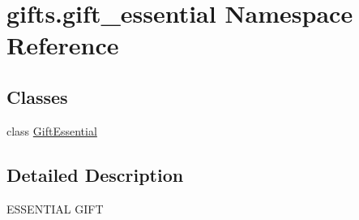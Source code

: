 \hypertarget{namespacegifts_1_1gift__essential}{}\section{gifts.\+gift\+\_\+essential Namespace Reference}
\label{namespacegifts_1_1gift__essential}
\subsection*{Classes}
\begin{DoxyCompactItemize}
\item 
class \hyperlink{classgifts_1_1gift__essential_1_1_gift_essential}{Gift\+Essential}
\end{DoxyCompactItemize}


\subsection{Detailed Description}
\begin{DoxyVerb}ESSENTIAL GIFT\end{DoxyVerb}
 